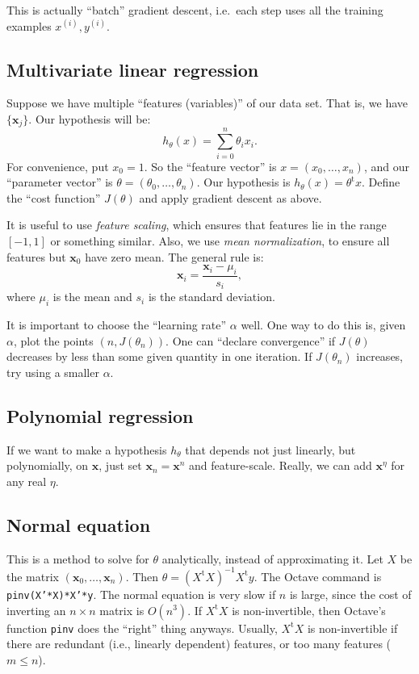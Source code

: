 \documentclass{article}
\newcommand{\bx}{\mathbf{x}}
\newcommand{\transpose}[1]{{#1}^\mathrm{t}}
\begin{document}
This is actually ``batch'' gradient descent, i.e.~each step uses all the 
training examples $x^{(i)},y^{(i)}$. 


\subsection{Multivariate linear regression}

Suppose we have multiple ``features (variables)'' of our data set. That is, we 
have $\{\bx_j\}$. Our hypothesis will be: 
\[
	h_\theta(x) = \sum_{i=0}^n \theta_i x_i .
\]
For convenience, put $x_0=1$. So the ``feature vector'' is 
$x=(x_0,\dots,x_n)$, and our ``parameter vector'' is 
$\theta=(\theta_0,\dots,\theta_n)$. Our hypothesis is 
$h_\theta(x) = \transpose\theta x$. Define the ``cost function'' $J(\theta)$ 
and apply gradient descent as above. 

It is useful to use \emph{feature scaling}, which ensures that features lie in 
the range $[-1,1]$ or something similar. Also, we use \emph{mean 
normalization}, to ensure all features but $\bx_0$ have zero mean. The general 
rule is:
\[
	\bx_i = \frac{\bx_i-\mu_i}{s_i} ,
\]
where $\mu_i$ is the mean and $s_i$ is the standard deviation. 

It is important to choose the ``learning rate'' $\alpha$ well. One way to do 
this is, given $\alpha$, plot the points $(n,J(\theta_n))$. One can ``declare 
convergence'' if $J(\theta)$ decreases by less than some given quantity in one 
iteration. If $J(\theta_n)$ increases, try using a smaller $\alpha$. 


\subsection{Polynomial regression}

If we want to make a hypothesis $h_\theta$ that depends not just linearly, but 
polynomially, on $\bx$, just set $\bx_n=\bx^n$ and feature-scale. Really, we 
can add $\bx^\eta$ for any real $\eta$. 


\subsection{Normal equation}

This is a method to solve for $\theta$ analytically, instead of approximating 
it. Let $X$ be the matrix $(\bx_0,\dots,\bx_n)$. Then 
$\theta=(\transpose X X)^{-1} \transpose X y$. The Octave command is 
\texttt{pinv(X'*X)*X'*y}. The normal equation is very slow if $n$ is large, 
since the cost of inverting an $n\times n$ matrix is $O(n^3)$. If 
$\transpose X X$ is non-invertible, then Octave's function \texttt{pinv} does 
the ``right'' thing anyways. Usually, $\transpose X X$ is non-invertible if 
there are redundant (i.e., linearly dependent) features, or too many features 
($m\leqslant n$). 
\end{document}
